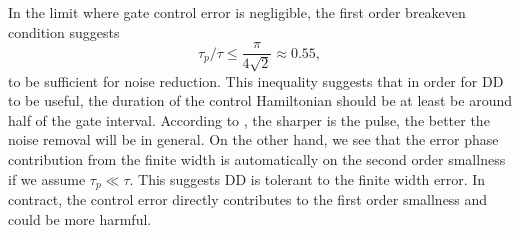 \documentclass[pra,reprint,superscriptaddress]{revtex4-2}
\begin{document}
In the limit where gate control error is negligible, the first order breakeven condition suggests
\begin{equation}
 \tau_p/\tau \le \frac{\pi}{4\sqrt{2}}\approx 0.55,
\end{equation}
to be sufficient for noise reduction. This inequality suggests that in order for DD to be useful, the duration of the control Hamiltonian should be at least be around half of the gate interval.  According to , the sharper is the pulse, the better the noise removal will be in general.
On the other hand, we see that the error phase contribution from the finite width is automatically on the second order smallness if we assume $\tau_p\ll \tau$. This suggests DD is tolerant to the finite width error. In contract, the control error directly contributes to the first order smallness and could be more harmful. 
\end{document}
